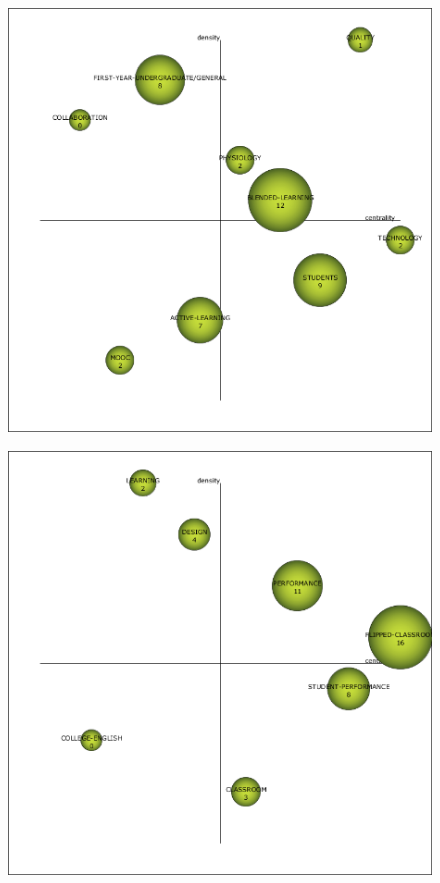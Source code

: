 \documentclass{textolivre-html}
\begin{document}
\begin{figure}[htbp]
\begin{minipage}{.45\textwidth}
 \label{fig03b}
 \end{minipage}
 \par\vspace{2ex}
 \begin{minipage}{.45\textwidth}
 \includegraphics[width=\textwidth]{Fig03c.png}
 \label{fig03c}
 \end{minipage}
 \hfill
 \begin{minipage}{.45\textwidth}
 \includegraphics[width=\textwidth]{Fig03d.png}

\end{minipage}
\end{figure}
\end{document}

